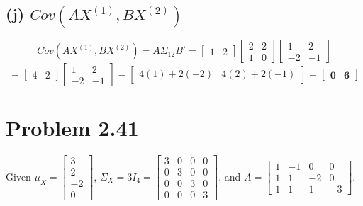 \documentclass[11pt]{article}
\begin{document}
\subsection*{(j) $Cov(AX^{(1)}, BX^{(2)})$}
\[
Cov(AX^{(1)}, BX^{(2)}) = A \Sigma_{12} B'
= \begin{bmatrix} 1 & 2 \end{bmatrix} \begin{bmatrix} 2 & 2 \\ 1 & 0 \end{bmatrix} \begin{bmatrix} 1 & 2 \\ -2 & -1 \end{bmatrix}
\]
\[
= \begin{bmatrix} 4 & 2 \end{bmatrix} \begin{bmatrix} 1 & 2 \\ -2 & -1 \end{bmatrix}
= \begin{bmatrix} 4(1) + 2(-2) & 4(2) + 2(-1) \end{bmatrix} = \mathbf{\begin{bmatrix} 0 & 6 \end{bmatrix}}
\]

\section*{Problem 2.41}
Given $\mu_X = \begin{bmatrix} 3 \\ 2 \\ -2 \\ 0 \end{bmatrix}$, $\Sigma_X = 3I_4 = \begin{bmatrix} 3 & 0 & 0 & 0 \\ 0 & 3 & 0 & 0 \\ 0 & 0 & 3 & 0 \\ 0 & 0 & 0 & 3 \end{bmatrix}$, and $A = \begin{bmatrix} 1 & -1 & 0 & 0 \\ 1 & 1 & -2 & 0 \\ 1 & 1 & 1 & -3 \end{bmatrix}$.
\end{document}

